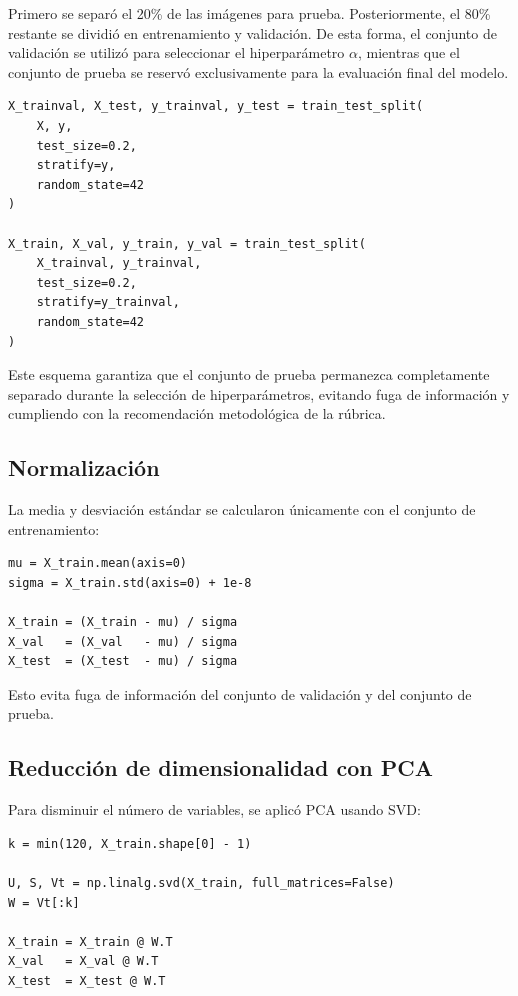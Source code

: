 \documentclass[12pt,a4paper]{article}
\begin{document}
Primero se separó el 20\% de las imágenes para prueba. Posteriormente, el 80\% restante se dividió en entrenamiento y validación. De esta forma, el conjunto de validación se utilizó para seleccionar el hiperparámetro $\alpha$, mientras que el conjunto de prueba se reservó exclusivamente para la evaluación final del modelo.

\begin{lstlisting}
X_trainval, X_test, y_trainval, y_test = train_test_split(
    X, y,
    test_size=0.2,
    stratify=y,
    random_state=42
)

X_train, X_val, y_train, y_val = train_test_split(
    X_trainval, y_trainval,
    test_size=0.2,
    stratify=y_trainval,
    random_state=42
)
\end{lstlisting}

Este esquema garantiza que el conjunto de prueba permanezca completamente separado durante la selección de hiperparámetros, evitando fuga de información y cumpliendo con la recomendación metodológica de la rúbrica.

\subsection{Normalización}
La media y desviación estándar se calcularon únicamente con el conjunto de entrenamiento:

\begin{lstlisting}
mu = X_train.mean(axis=0)
sigma = X_train.std(axis=0) + 1e-8

X_train = (X_train - mu) / sigma
X_val   = (X_val   - mu) / sigma
X_test  = (X_test  - mu) / sigma
\end{lstlisting}

Esto evita fuga de información del conjunto de validación y del conjunto de prueba.

\subsection{Reducción de dimensionalidad con PCA}
Para disminuir el número de variables, se aplicó PCA usando SVD:

\begin{lstlisting}
k = min(120, X_train.shape[0] - 1)

U, S, Vt = np.linalg.svd(X_train, full_matrices=False)
W = Vt[:k]

X_train = X_train @ W.T
X_val   = X_val @ W.T
X_test  = X_test @ W.T
\end{lstlisting}
\end{document}

